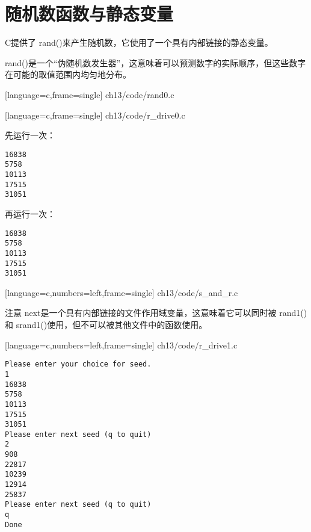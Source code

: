 \section{随机数函数与静态变量}

\begin{frame}[fragile]\ft{\secname} 
  C提供了{ rand()}来产生随机数，它使用了一个具有内部链接的静态变量。

  { rand()}是一个“伪随机数发生器”，这意味着可以预测数字的实际顺序，但这些数字在可能的取值范围内均匀地分布。
\end{frame}

\begin{frame}[fragile]\ft{\secname} 
  
  [language=c,frame=single]
  {ch13/code/rand0.c}
\end{frame}

\begin{frame}[fragile]\ft{\secname} 
  
  [language=c,frame=single]
  {ch13/code/r_drive0.c}
\end{frame}

\begin{frame}[fragile]\ft{\secname}
  先运行一次：
\begin{lstlisting}[backgroundcolor=\color{red!20}]
16838
5758
10113
17515
31051  
\end{lstlisting}
  再运行一次：
\begin{lstlisting}[backgroundcolor=\color{red!20}]
16838
5758
10113
17515
31051  
\end{lstlisting}
\end{frame}

\begin{frame}[fragile]\ft{\secname}
  
  [language=c,numbers=left,frame=single]
  {ch13/code/s_and_r.c}  
\end{frame}

\begin{frame}[fragile]\ft{\secname}
注意{ next}是一个具有内部链接的文件作用域变量，这意味着它可以同时被{ rand1()}和{ srand1()}使用，但不可以被其他文件中的函数使用。
\end{frame}

\begin{frame}\ft{\secname}
  
  [language=c,numbers=left,frame=single]
  {ch13/code/r_drive1.c}  
\end{frame}

\begin{frame}\ft{\secname}
  \begin{lstlisting}[backgroundcolor=\color{red!20}]
Please enter your choice for seed.
1
16838
5758
10113
17515
31051
Please enter next seed (q to quit)
2
908
22817
10239
12914
25837
Please enter next seed (q to quit)
q
Done
  \end{lstlisting}
\end{frame}